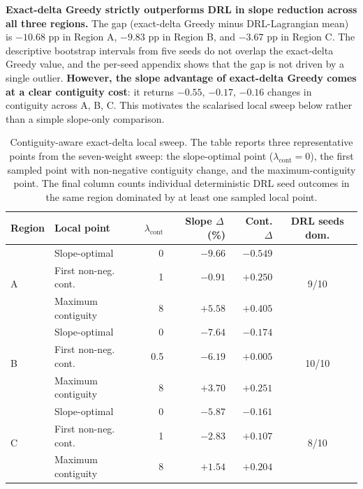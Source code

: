 \documentclass[]{interact}
\theoremstyle{plain}
\begin{document}
\textbf{Exact-delta Greedy strictly outperforms DRL in slope reduction across all three regions.} The gap (exact-delta Greedy minus DRL-Lagrangian mean) is $-10.68$ pp in Region A, $-9.83$ pp in Region B, and $-3.67$ pp in Region C. The descriptive bootstrap intervals from five seeds do not overlap the exact-delta Greedy value, and the per-seed appendix shows that the gap is not driven by a single outlier. \textbf{However, the slope advantage of exact-delta Greedy comes at a clear contiguity cost}: it returns $-0.55$, $-0.17$, $-0.16$ changes in contiguity across A, B, C. This motivates the scalarised local sweep below rather than a simple slope-only comparison.

\begin{table}[htbp]
\centering
\caption{Contiguity-aware exact-delta local sweep. The table reports three representative points from the seven-weight sweep: the slope-optimal point ($\lambda_{\mathrm{cont}}=0$), the first sampled point with non-negative contiguity change, and the maximum-contiguity point. The final column counts individual deterministic DRL seed outcomes in the same region dominated by at least one sampled local point.}
\label{tab:local-pareto}
\small
\begin{tabular}{llrrrc}
\toprule
Region & Local point & $\lambda_{\mathrm{cont}}$ & Slope $\Delta$\,(\%) & Cont. $\Delta$ & DRL seeds dom. \\
\midrule
\multirow{3}{*}{A} & Slope-optimal & 0 & $-9.66$ & $-0.549$ & \multirow{3}{*}{9/10} \\
& First non-neg. cont. & 1 & $-0.91$ & $+0.250$ & \\
& Maximum contiguity & 8 & $+5.58$ & $+0.405$ & \\
\midrule
\multirow{3}{*}{B} & Slope-optimal & 0 & $-7.64$ & $-0.174$ & \multirow{3}{*}{10/10} \\
& First non-neg. cont. & 0.5 & $-6.19$ & $+0.005$ & \\
& Maximum contiguity & 8 & $+3.70$ & $+0.251$ & \\
\midrule
\multirow{3}{*}{C} & Slope-optimal & 0 & $-5.87$ & $-0.161$ & \multirow{3}{*}{8/10} \\
& First non-neg. cont. & 1 & $-2.83$ & $+0.107$ & \\
& Maximum contiguity & 8 & $+1.54$ & $+0.204$ & \\
\bottomrule
\end{tabular}
\end{table}
\end{document}
